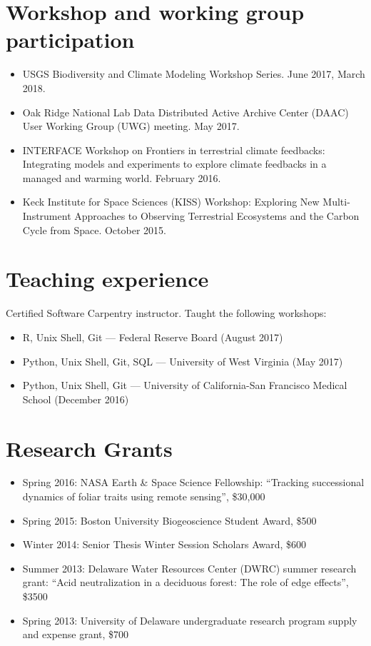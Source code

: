 \section*{Workshop and working group participation}

\begin{itemize}
  \item USGS Biodiversity and Climate Modeling Workshop Series.
    June 2017, March 2018.

  \item Oak Ridge National Lab Data Distributed Active Archive Center (DAAC) User Working Group (UWG) meeting. 
    May 2017.

  \item INTERFACE Workshop on Frontiers in terrestrial climate feedbacks: Integrating models and experiments to explore climate feedbacks in a managed and warming world. 
    February 2016.

  \item Keck Institute for Space Sciences (KISS) Workshop: Exploring New Multi-Instrument Approaches to Observing Terrestrial Ecosystems and the Carbon Cycle from Space.  
    October 2015.
\end{itemize}


\section*{Teaching experience}

Certified Software Carpentry instructor. Taught the following workshops:
\begin{itemize}
  \item R, Unix Shell, Git --- Federal Reserve Board (August 2017)
  \item Python, Unix Shell, Git, SQL --- University of West Virginia (May 2017)
  \item Python, Unix Shell, Git --- University of California-San Francisco Medical School (December 2016)
\end{itemize}

\section*{Research Grants}

\begin{itemize}
  \item Spring 2016: NASA Earth \& Space Science Fellowship: ``Tracking successional dynamics of foliar traits using remote sensing'', \$30,000
  \item Spring 2015: Boston University Biogeoscience Student Award, \$500
  \item Winter 2014: Senior Thesis Winter Session Scholars Award, \$600
  \item Summer 2013: Delaware Water Resources Center (DWRC) summer research grant: ``Acid neutralization in a deciduous forest: The role of edge effects'', \$3500
  \item Spring 2013: University of Delaware undergraduate research program supply and expense grant, \$700
\end{itemize}


